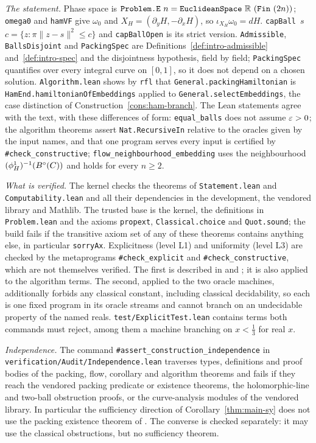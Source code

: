 \emph{The statement.} Phase space is $\texttt{Problem.E}~n=\texttt{EuclideanSpace}\ \R\ (\texttt{Fin}\ (2n))$;
\texttt{omega0} and \texttt{hamVF} give $\omega_0$ and $X_H=(\partial_yH,-\partial_xH)$, so $\iota_{X_H}\omega_0=dH$.
\texttt{capBall}~$s$~$c=\{z:\pi\|z-s\|^2\le c\}$ and \texttt{capBallOpen} is its strict version. \texttt{Admissible},
\texttt{BallsDisjoint} and \texttt{PackingSpec} are Definitions~\ref{def:intro-admissible} and~\ref{def:intro-spec} and the
disjointness hypothesis, field by field; \texttt{PackingSpec} quantifies over every integral curve on $[0,1]$, so it
does not depend on a chosen solution. \texttt{Algorithm.lean} shows by \texttt{rfl} that
\texttt{General.packingHamiltonian} is \texttt{HamEnd.hamiltonianOfEmbeddings} applied to
\texttt{General.selectEmbeddings}, the case distinction of Construction~\ref{cons:ham-branch}. The Lean statements agree
with the text, with these differences of form:
\texttt{equal\_balls} does not assume $\varepsilon>0$; the algorithm theorems assert \texttt{Nat.RecursiveIn} relative to the
oracles given by the input names, and that one program serves every input is certified by
\texttt{\#check\_constructive}; \texttt{flow\_neighbourhood\_embedding} uses the neighbourhood $(\phi^1_H)^{-1}(B^{\circ}(C))$
and holds for every $n\ge2$.

\emph{What is verified.} The kernel checks the theorems of \texttt{Statement.lean} and \texttt{Computability.lean}
and all their dependencies in the development, the vendored library and Mathlib. The trusted base is the kernel, the
definitions in \texttt{Problem.lean} and the axioms \texttt{propext}, \texttt{Classical.choice} and
\texttt{Quot.sound}; the build fails if the transitive axiom set of any of these theorems contains anything else, in
particular \texttt{sorryAx}. Explicitness (level L1) and uniformity (level L3) are checked by the metaprograms
\texttt{\#check\_explicit} and \texttt{\#check\_constructive}, which are not themselves verified. The first is described
in  and ; it is also applied to the algorithm terms. The second, applied to the two
oracle machines, additionally forbids any classical constant, including classical decidability, so each is one fixed
program in its oracle streams and cannot branch on an undecidable property of the named reals.
\texttt{test/ExplicitTest.lean} contains terms both commands must reject, among them a machine branching on
$x<\frac13$ for real $x$.

\emph{Independence.} The command \texttt{\#assert\_construction\_independence} in
\texttt{verification/Audit/Independence.lean} traverses types, definitions and proof bodies of the packing, flow,
corollary and algorithm theorems and fails if they reach the vendored packing predicate or existence theorems, the
holomorphic-line and two-ball obstruction proofs, or the curve-analysis modules of the vendored library. In
particular the sufficiency direction of Corollary~\ref{thm:main-sy} does not use the packing existence theorem of
\cite{OpenAI2026}. The converse is checked separately: it may use the classical obstructions, but no sufficiency
theorem.

